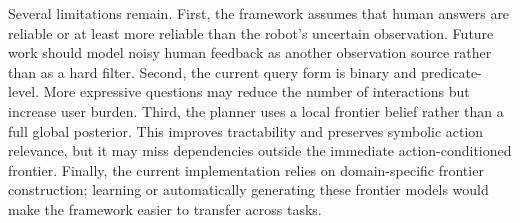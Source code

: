 Several limitations remain. First, the framework assumes that human answers are reliable or at least more reliable than the robot's uncertain observation. Future work should model noisy human feedback as another observation source rather than as a hard filter. Second, the current query form is binary and predicate-level. More expressive questions may reduce the number of interactions but increase user burden. Third, the planner uses a local frontier belief rather than a full global posterior. This improves tractability and preserves symbolic action relevance, but it may miss dependencies outside the immediate action-conditioned frontier. Finally, the current implementation relies on domain-specific frontier construction; learning or automatically generating these frontier models would make the framework easier to transfer across tasks.
